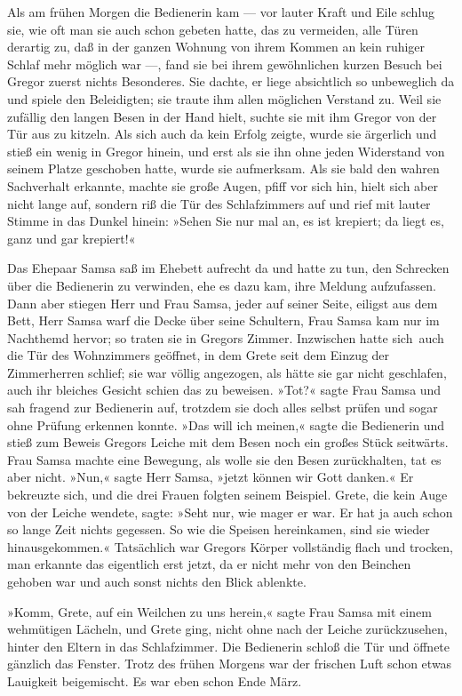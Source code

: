 Als am frühen Morgen die Bedienerin kam --- vor lauter Kraft und Eile
schlug sie, wie oft man sie auch schon gebeten hatte, das zu vermeiden,
alle Türen derartig zu, daß in der ganzen Wohnung von ihrem Kommen an
kein ruhiger Schlaf mehr möglich war ---, fand sie bei ihrem gewöhnlichen
kurzen Besuch bei Gregor zuerst nichts Besonderes. Sie dachte, er liege
absichtlich so unbeweglich da und spiele den Beleidigten; sie traute
ihm allen möglichen Verstand zu. Weil sie zufällig den langen Besen in
der Hand hielt, suchte sie mit ihm Gregor von der Tür aus zu kitzeln.
Als sich auch da kein Erfolg zeigte, wurde sie ärgerlich und stieß ein
wenig in Gregor hinein, und erst als sie ihn ohne jeden Widerstand von
seinem Platze geschoben hatte, wurde sie aufmerksam. Als sie bald den
wahren Sachverhalt erkannte, machte sie große Augen, pfiff vor sich hin,
hielt sich aber nicht lange auf, sondern riß die Tür des Schlafzimmers
auf und rief mit lauter Stimme in das Dunkel hinein: »Sehen Sie nur mal
an, es ist krepiert; da liegt es, ganz und gar krepiert!«

Das Ehepaar Samsa saß im Ehebett aufrecht da und hatte zu tun, den
Schrecken über die Bedienerin zu verwinden, ehe es dazu kam, ihre
Meldung aufzufassen. Dann aber stiegen Herr und Frau Samsa, jeder auf
seiner Seite, eiligst aus dem Bett, Herr Samsa warf die Decke über seine
Schultern, Frau Samsa kam nur im Nachthemd hervor; so traten sie in
Gregors Zimmer. Inzwischen hatte sich\est\ auch die Tür des Wohnzimmers
geöffnet, in dem Grete seit dem Einzug der Zimmerherren schlief; sie war
völlig angezogen, als hätte sie gar nicht geschlafen, auch ihr bleiches
Gesicht schien das zu beweisen. »Tot?« sagte Frau Samsa und sah fragend
zur Bedienerin auf, trotzdem sie doch alles selbst prüfen und sogar ohne
Prüfung erkennen konnte. »Das will ich meinen,« sagte die Bedienerin und
stieß zum Beweis Gregors Leiche mit dem Besen noch ein großes Stück
seitwärts. Frau Samsa machte eine Bewegung, als wolle sie den Besen
zurückhalten, tat es aber nicht. »Nun,« sagte Herr Samsa, »jetzt können
wir Gott danken.« Er bekreuzte sich, und die drei Frauen folgten seinem
Beispiel. Grete, die kein Auge von der Leiche wendete, sagte: »Seht
nur, wie mager er war. Er hat ja auch schon so lange Zeit nichts
gegessen. So wie die Speisen hereinkamen, sind sie wieder
hinausgekommen.« Tatsächlich war Gregors Körper vollständig flach und
trocken, man erkannte das eigentlich erst jetzt, da er nicht mehr von
den Beinchen gehoben war und auch sonst nichts den Blick ablenkte.

»Komm, Grete, auf ein Weilchen zu uns herein,« sagte Frau Samsa mit
einem wehmütigen Lächeln, und Grete ging, nicht ohne nach der Leiche
zurückzusehen, hinter den Eltern in das Schlafzimmer. Die Bedienerin
schloß die Tür und öffnete gänzlich das Fenster. Trotz des frühen
Morgens war der frischen Luft schon etwas Lauigkeit beigemischt. Es war
eben schon Ende März.

